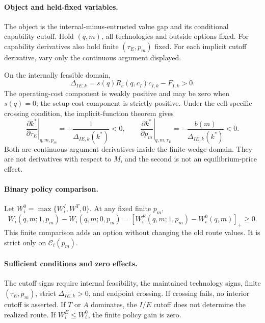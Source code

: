\paragraph{Object and held-fixed variables.}
The object is the internal-minus-entrusted value gap and its conditional
capability cutoff. Hold \((q,m)\), all technologies and outside options fixed.
For capability derivatives also hold finite \((\tau_E,p_m)\) fixed. For each
implicit cutoff derivative, vary only the continuous argument displayed.

On the internally feasible domain,
\begin{equation}
  \Delta_{IE,k}
  =
  s(q)R_c(q,c_I)c_{I,k}-F_{I,k}>0.
  \label{eq:p15-gap-capability}
\end{equation}
The operating-cost component is weakly positive and may be zero when
\(s(q)=0\); the setup-cost component is strictly positive. Under the
cell-specific crossing condition, the implicit-function theorem gives
\begin{equation}
  \left.\frac{\partial k^*}{\partial\tau_E}\right|_{q,m,p_m}
  =
  -\frac{1}{\Delta_{IE,k}(k^*)}<0,
  \qquad
  \left.\frac{\partial k^*}{\partial p_m}\right|_{q,m,\tau_E}
  =
  -\frac{b(m)}{\Delta_{IE,k}(k^*)}<0.
  \label{eq:p15-cutoff-derivatives}
\end{equation}
Both are continuous-argument derivatives inside the finite-wedge domain.
They are not derivatives with respect to \(M\), and the second is not an
equilibrium-price effect.

\paragraph{Binary policy comparison.}
Let \(W_i^0=\max\{W_i^I,W^T,0\}\). At any fixed finite \(p_m\),
\begin{equation}
  W_i(q,m;1,p_m)-W_i(q,m;0,p_m)
  =
  [W_i^E(q,m;1,p_m)-W_i^0(q,m)]_+\geq0.
  \label{eq:p15-fixed-project-gain}
\end{equation}
This finite comparison adds an option without changing the old route values.
It is strict only on \(\mathcal C_i(p_m)\).

\paragraph{Sufficient conditions and zero effects.}
The cutoff signs require internal feasibility, the maintained technology signs,
finite \((\tau_E,p_m)\), strict \(\Delta_{IE,k}>0\), and endpoint crossing.
If crossing fails, no interior cutoff is asserted. If \(T\) or \(A\) dominates,
the \(I/E\) cutoff does not determine the realized route. If
\(W_i^E\leq W_i^0\), the finite policy gain is zero.

